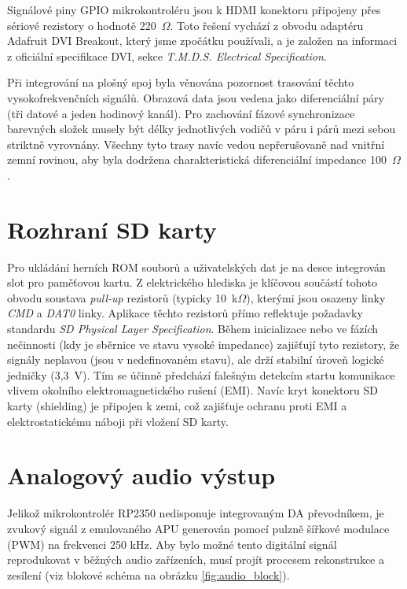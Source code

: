 Signálové piny GPIO mikrokontroléru jsou k HDMI konektoru připojeny přes sériové rezistory o hodnotě
220~$\Omega$. Toto řešení vychází z obvodu adaptéru Adafruit DVI Breakout, který jsme zpočátku
používali, a je založen na informaci z oficiální specifikace DVI, sekce \textit{T.M.D.S. Electrical
Specification}.\cite{dvi-spec}

Při integrování na plošný spoj byla věnována pozornost trasování těchto vysokofrekvenčních signálů.
Obrazová data jsou vedena jako diferenciální páry (tři datové a jeden hodinový kanál). Pro zachování
fázové synchronizace barevných složek musely být délky jednotlivých vodičů v páru i párů mezi sebou
striktně vyrovnány. Všechny tyto trasy navíc vedou nepřerušovaně nad vnitřní zemní rovinou, aby byla
dodržena charakteristická diferenciální impedance 100~$\Omega$\cite{dvi-spec}.

\section{Rozhraní SD karty}

Pro ukládání herních ROM souborů a uživatelských dat je na desce integrován slot pro paměťovou
kartu. Z elektrického hlediska je klíčovou součástí tohoto obvodu soustava \textit{pull-up}
rezistorů (typicky 10~k$\Omega$), kterými jsou osazeny linky \textit{CMD} a \textit{DAT0} linky.
Aplikace těchto rezistorů přímo reflektuje požadavky standardu \textit{SD Physical Layer
Specification}.\cite{sd-spec} Během inicializace nebo ve fázích nečinnosti (kdy je sběrnice ve stavu
vysoké impedance) zajišťují tyto rezistory, že signály neplavou (jsou v nedefinovaném stavu), ale
drží stabilní úroveň logické jedničky (3,3~V). Tím se účinně předchází falešným detekcím startu
komunikace vlivem okolního elektromagnetického rušení (EMI). Navíc kryt konektoru SD karty
(shielding) je připojen k zemi, což zajišťuje ochranu proti EMI a elektrostatickému náboji při
vložení SD karty.

\label{sec:dac}
\section{Analogový audio výstup}

Jelikož mikrokontrolér RP2350 nedisponuje integrovaným DA převodníkem, je zvukový signál z
emulovaného APU generován pomocí pulzně šířkové modulace (PWM) na frekvenci 250 kHz. Aby bylo možné
tento digitální signál reprodukovat v běžných audio zařízeních, musí projít procesem rekonstrukce a
zesílení (viz blokové schéma na obrázku \ref{fig:audio_block}).

